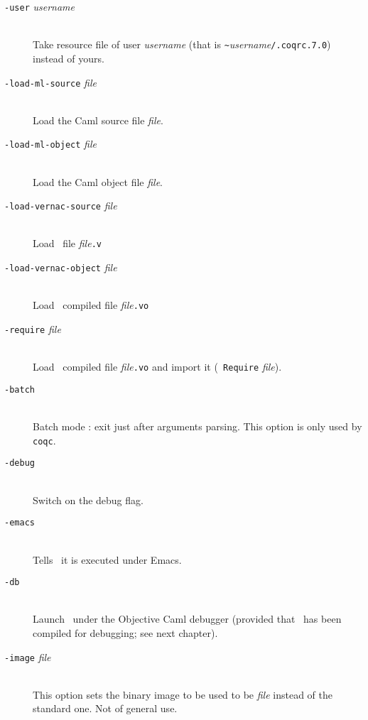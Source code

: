 \begin{description}
\item[{\tt -user} {\em username}]\ \\
  Take resource file of user {\em username} (that is 
  \verb+~+{\em username}{\tt /.coqrc.7.0}) instead of yours.

\item[{\tt -load-ml-source} {\em file}]\ \\
  Load the Caml source file {\em file}.

\item[{\tt -load-ml-object} {\em file}]\ \\
  Load the Caml object file {\em file}.

\item[{\tt -load-vernac-source} {\em file}]\ \\
  Load \Coq~file {\em file}{\tt .v}

\item[{\tt -load-vernac-object} {\em file}]\ \\
  Load \Coq~compiled file {\em file}{\tt .vo}

%
\item[{\tt -require} {\em file}]\ \\
  Load \Coq~compiled file {\em file}{\tt .vo} and import it ({\tt
    Require} {\em file}).

\item[{\tt -batch}]\ \\
  Batch mode : exit just after arguments parsing. This option is only
  used by {\tt coqc}.

\item[{\tt -debug}]\ \\
  Switch on the debug flag.

\item[{\tt -emacs}]\ \\
  Tells \Coq\ it is executed under Emacs.

\item[{\tt -db}]\ \\
  Launch \Coq\ under the Objective Caml debugger (provided that \Coq\
  has been compiled for debugging; see next chapter).

\item[{\tt -image} {\em file}]\ \\
  This option sets the binary image to be used to be {\em file}
  instead of the standard one. Not of general use.


\end{description}
